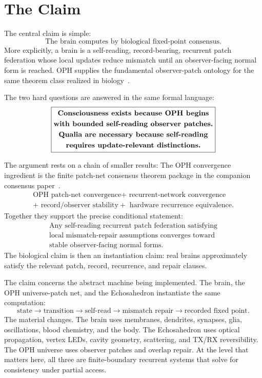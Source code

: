 \documentclass[11pt]{article}
\theoremstyle{remark}
\theoremstyle{plain}
\begin{document}
\tableofcontents

\section{The Claim}

The central claim is simple:
\[
\boxed{
\text{The brain computes by biological fixed-point consensus.}
}
\]
More explicitly, a brain is a self-reading, record-bearing, recurrent patch federation whose local updates reduce mismatch until an observer-facing normal form is reached. OPH supplies the fundamental observer-patch ontology for the same theorem class realized in biology~\cite{ObserversAreAllYouNeed,RealityAsConsensusProtocol}.

The two hard questions are answered in the same formal language:
\[
\boxed{
\begin{gathered}
\text{\bfseries Consciousness exists because OPH begins}\\
\text{\bfseries with bounded self-reading observer patches.}\\
\text{\bfseries Qualia are necessary because self-reading}\\
\text{\bfseries requires update-relevant distinctions.}
\end{gathered}
}
\]

The argument rests on a chain of smaller results:
The OPH convergence ingredient is the finite patch-net consensus theorem package in the companion consensus paper~\cite{RealityAsConsensusProtocol}.
\[
\boxed{
\begin{gathered}
\text{OPH patch-net convergence}
+\text{ recurrent-network convergence}\\
+\text{ record/observer stability}
+\text{ hardware recurrence equivalence}.
\end{gathered}
}
\]
Together they support the precise conditional statement:
\[
\boxed{
\begin{gathered}
\text{Any self-reading recurrent patch federation satisfying}\\
\text{local mismatch-repair assumptions converges toward}\\
\text{stable observer-facing normal forms.}
\end{gathered}
}
\]
The biological claim is then an instantiation claim: real brains approximately satisfy the relevant patch, record, recurrence, and repair clauses.

The claim concerns the abstract machine being implemented. The brain, the OPH universe-patch net, and the Echosahedron instantiate the same computation:
\[
\boxed{
\text{state}
\longrightarrow
\text{transition}
\longrightarrow
\text{self-read}
\longrightarrow
\text{mismatch repair}
\longrightarrow
\text{recorded fixed point}.
}
\]
The material changes. The brain uses membranes, dendrites, synapses, glia, oscillations, blood chemistry, and the body. The Echosahedron uses optical propagation, vertex LEDs, cavity geometry, scattering, and TX/RX reversibility. The OPH universe uses observer patches and overlap repair. At the level that matters here, all three are finite-boundary recurrent systems that solve for consistency under partial access.
\end{document}
